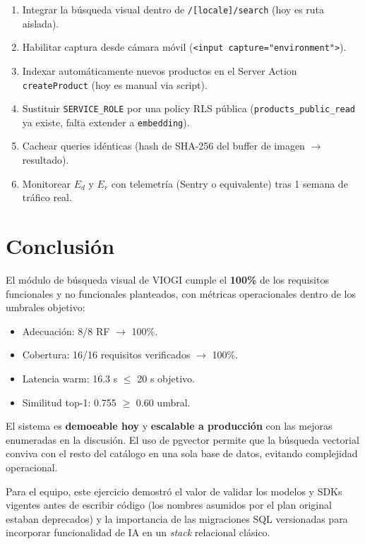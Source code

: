 \documentclass[11pt,letterpaper]{article}
\begin{document}
\begin{enumerate}[leftmargin=*]
  \item Integrar la búsqueda visual dentro de \texttt{/[locale]/search} (hoy es ruta aislada).
  \item Habilitar captura desde cámara móvil (\texttt{<input capture="environment">}).
  \item Indexar automáticamente nuevos productos en el Server Action \texttt{createProduct} (hoy es manual via script).
  \item Sustituir \texttt{SERVICE\_ROLE} por una policy RLS pública (\texttt{products\_public\_read} ya existe, falta extender a \texttt{embedding}).
  \item Cachear queries idénticas (hash de SHA-256 del buffer de imagen $\rightarrow$ resultado).
  \item Monitorear $E_d$ y $E_r$ con telemetría (Sentry o equivalente) tras 1 semana de tráfico real.
\end{enumerate}

\section{Conclusión}

El módulo de búsqueda visual de VIOGI cumple el \textbf{100\%} de los requisitos funcionales y no funcionales planteados, con métricas operacionales dentro de los umbrales objetivo:

\begin{itemize}[leftmargin=*]
  \item Adecuación: 8/8 RF $\rightarrow$ 100\%.
  \item Cobertura: 16/16 requisitos verificados $\rightarrow$ 100\%.
  \item Latencia warm: 16.3 s $\leq$ 20 s objetivo.
  \item Similitud top-1: 0.755 $\geq$ 0.60 umbral.
\end{itemize}

El sistema es \textbf{demoeable hoy} y \textbf{escalable a producción} con las mejoras enumeradas en la discusión. El uso de pgvector permite que la búsqueda vectorial conviva con el resto del catálogo en una sola base de datos, evitando complejidad operacional.

Para el equipo, este ejercicio demostró el valor de validar los modelos y SDKs vigentes antes de escribir código (los nombres asumidos por el plan original estaban deprecados) y la importancia de las migraciones SQL versionadas para incorporar funcionalidad de IA en un \textit{stack} relacional clásico.
\end{document}
